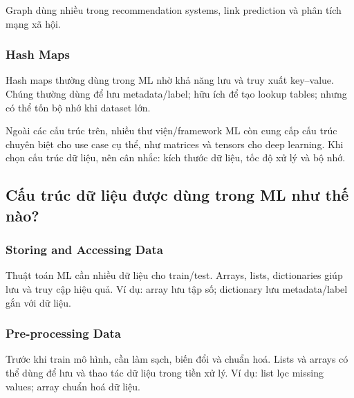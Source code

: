 \begin{ynghia}[title={Ứng dụng graph}]
Graph dùng nhiều trong recommendation systems, link prediction và phân tích mạng xã hội.
\end{ynghia}

\subsubsection{Hash Maps}
\begin{dinhnghia}[title={Hash maps}]
Hash maps thường dùng trong ML nhờ khả năng lưu và truy xuất key--value.
Chúng thường dùng để lưu metadata/label; hữu ích để tạo lookup tables; nhưng có thể tốn bộ nhớ khi dataset lớn.
\end{dinhnghia}

\begin{luuy}[title={Cấu trúc chuyên biệt}]
Ngoài các cấu trúc trên, nhiều thư viện/framework ML còn cung cấp cấu trúc chuyên biệt cho use case cụ thể, như matrices và tensors cho deep learning.
Khi chọn cấu trúc dữ liệu, nên cân nhắc: kích thước dữ liệu, tốc độ xử lý và bộ nhớ.
\end{luuy}

\subsection{Cấu trúc dữ liệu được dùng trong ML như thế nào?}

\subsubsection{Storing and Accessing Data}
\begin{phuongphap}[title={Lưu và truy cập dữ liệu}]
Thuật toán ML cần nhiều dữ liệu cho train/test.
Arrays, lists, dictionaries giúp lưu và truy cập hiệu quả.
Ví dụ: array lưu tập số; dictionary lưu metadata/label gắn với dữ liệu.
\end{phuongphap}

\subsubsection{Pre-processing Data}
\begin{phuongphap}[title={Tiền xử lý dữ liệu}]
Trước khi train mô hình, cần làm sạch, biến đổi và chuẩn hoá.
Lists và arrays có thể dùng để lưu và thao tác dữ liệu trong tiền xử lý.
Ví dụ: list lọc missing values; array chuẩn hoá dữ liệu.
\end{phuongphap}

